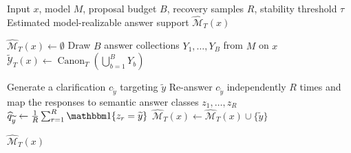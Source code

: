 





\begin{algorithm}[t]
\caption{CircleClar}
\label{alg:mros}
\begin{algorithmic}[1]
\Require Input $x$, model $M$, proposal budget $B$, recovery samples $R$,
stability threshold $\tau$
\Ensure Estimated model-realizable answer support $\widehat{\mathcal{M}}_T(x)$

\State $\widehat{\mathcal{M}}_T(x) \gets \emptyset$
\State Draw $B$ answer collections $Y_1,\ldots,Y_B$ from $M$ on $x$
\State $\widetilde{\mathcal{Y}}_T(x) \gets
\operatorname{Canon}_T\!\left(\bigcup_{b=1}^{B}Y_b\right)$

    \State Generate a clarification $c_{\widetilde{y}}$ targeting
    $\widetilde{y}$
    \State Re-answer $c_{\widetilde{y}}$ independently $R$ times and map
    the responses to semantic answer classes $z_1,\ldots,z_R$
    \State $\widehat{q}_{\widetilde{y}} \gets
    \frac{1}{R}\sum_{r=1}^{R}\indicator\{z_r=\widetilde{y}\}$
        \State $\widehat{\mathcal{M}}_T(x)
        \gets \widehat{\mathcal{M}}_T(x) \cup \{\widetilde{y}\}$
    \EndIf
\EndFor

\State \Return $\widehat{\mathcal{M}}_T(x)$
\end{algorithmic}
\end{algorithm}



